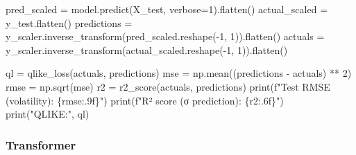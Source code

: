 \documentclass[
  letterpaper,
  DIV=11,
  numbers=noendperiod]{scrartcl}
\newenvironment{Shaded}{\begin{snugshade}}{\end{snugshade}}
\newcommand{\BuiltInTok}[1]{\textcolor[rgb]{0.00,0.23,0.31}{#1}}
\newcommand{\DecValTok}[1]{\textcolor[rgb]{0.68,0.00,0.00}{#1}}
\newcommand{\NormalTok}[1]{\textcolor[rgb]{0.00,0.23,0.31}{#1}}
\newcommand{\OperatorTok}[1]{\textcolor[rgb]{0.37,0.37,0.37}{#1}}
\newcommand{\SpecialCharTok}[1]{\textcolor[rgb]{0.37,0.37,0.37}{#1}}
\newcommand{\SpecialStringTok}[1]{\textcolor[rgb]{0.13,0.47,0.30}{#1}}
\newcommand{\StringTok}[1]{\textcolor[rgb]{0.13,0.47,0.30}{#1}}
\begin{document}
\begin{Shaded}
\begin{Highlighting}[]
\NormalTok{pred\_scaled }\OperatorTok{=}\NormalTok{ model.predict(X\_test, verbose}\OperatorTok{=}\DecValTok{1}\NormalTok{).flatten()}
\NormalTok{actual\_scaled }\OperatorTok{=}\NormalTok{ y\_test.flatten()}
\NormalTok{predictions }\OperatorTok{=}\NormalTok{ y\_scaler.inverse\_transform(pred\_scaled.reshape(}\OperatorTok{{-}}\DecValTok{1}\NormalTok{, }\DecValTok{1}\NormalTok{)).flatten()}
\NormalTok{actuals     }\OperatorTok{=}\NormalTok{ y\_scaler.inverse\_transform(actual\_scaled.reshape(}\OperatorTok{{-}}\DecValTok{1}\NormalTok{, }\DecValTok{1}\NormalTok{)).flatten()}
\end{Highlighting}
\end{Shaded}

\begin{Shaded}
\begin{Highlighting}[]
\NormalTok{ql }\OperatorTok{=}\NormalTok{ qlike\_loss(actuals, predictions)}
\NormalTok{mse   }\OperatorTok{=}\NormalTok{ np.mean((predictions }\OperatorTok{{-}}\NormalTok{ actuals) }\OperatorTok{**} \DecValTok{2}\NormalTok{)}
\NormalTok{rmse  }\OperatorTok{=}\NormalTok{ np.sqrt(mse)}
\NormalTok{r2 }\OperatorTok{=}\NormalTok{ r2\_score(actuals, predictions)}
\BuiltInTok{print}\NormalTok{(}\SpecialStringTok{f"Test RMSE (volatility): }\SpecialCharTok{\{}\NormalTok{rmse}\SpecialCharTok{:.9f\}}\SpecialStringTok{"}\NormalTok{)}
\BuiltInTok{print}\NormalTok{(}\SpecialStringTok{f"R² score (σ prediction): }\SpecialCharTok{\{}\NormalTok{r2}\SpecialCharTok{:.6f\}}\SpecialStringTok{"}\NormalTok{)}
\BuiltInTok{print}\NormalTok{(}\StringTok{"QLIKE:"}\NormalTok{, ql)}
\end{Highlighting}
\end{Shaded}

\subsubsection{Transformer}\label{transformer-1}
\end{document}
